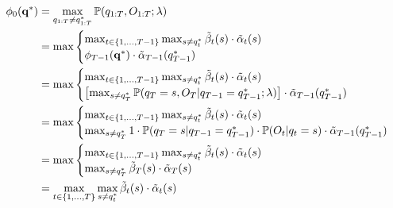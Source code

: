 \begin{equation*}
\begin{aligned}
\phi_0(\mathbf{q}^*) 
&= \max_{q_{1:T} \ne q_{1:T}^*} \mathbb{P}(q_{1:T}, O_{1:T}; \lambda) \\
&= \max \begin{cases}
           \max_{t \in \{1,\dots,T-1\}} \max_{s \ne q_t^*} \tilde{\beta}_t(s) \cdot \tilde{\alpha}_t(s) \\
           \phi_{T-1}(\mathbf{q}^*) \cdot \tilde{\alpha}_{T-1}(q_{T-1}^*)
        \end{cases} \\
&= \max \begin{cases}
           \max_{t \in \{1,\dots,T-1\}} \max_{s \ne q_t^*} \tilde{\beta}_t(s) \cdot \tilde{\alpha}_t(s) \\
           \left[ \max_{s \ne q_{T}^*} \mathbb{P}(q_T = s, O_T |q_{T-1} = q_{T-1}^*; \lambda) \right] \cdot \tilde{\alpha}_{T-1}(q_{T-1}^*)
        \end{cases} \\
&= \max \begin{cases}
           \max_{t \in \{1,\dots,T-1\}} \max_{s \ne q_t^*} \tilde{\beta}_t(s) \cdot \tilde{\alpha}_t(s) \\
           \max_{s \ne q_{T}^*} 1 \cdot \mathbb{P}(q_T = s |q_{T-1} = q_{T-1}^*) \cdot \mathbb{P}(O_t |q_t = s) \cdot \tilde{\alpha}_{T-1}(q_{T-1}^*)
        \end{cases} \\
&= \max \begin{cases}
           \max_{t \in \{1,\dots,T-1\}} \max_{s \ne q_t^*} \tilde{\beta}_t(s) \cdot \tilde{\alpha}_t(s) \\
           \max_{s \ne q_{T}^*} \tilde{\beta}_T(s) \cdot \tilde{\alpha}_T(s)
        \end{cases} \\
&= \max_{t \in \{1,\dots,T\}} \max_{s \ne q_t^*} \tilde{\beta}_t(s) \cdot \tilde{\alpha}_t(s)
\end{aligned}
\end{equation*}

